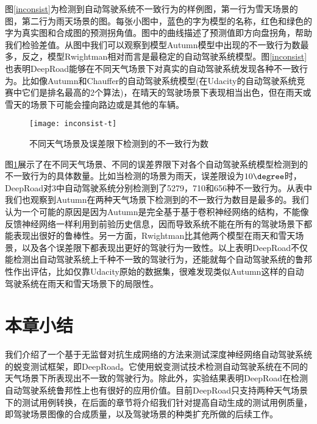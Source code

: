 图\ref{inconsist}为检测到自动驾驶系统不一致行为的样例图，第一行为雪天场景的图，第二行为雨天场景的图。每张小图中，蓝色的字为模型的名称，红色和绿色的字为真实图和合成图的预测拐角值。图中的曲线描述了预测值即方向盘拐角，帮助我们检验差值。从图中我们可以观察到模型Autumn模型中出现的不一致行为数最多，反之，模型Rwightman相对而言是最稳定的自动驾驶系统模型。图\ref{inconsist}也表明DeepRoad能够在不同天气场景下对真实的自动驾驶系统发现各种不一致行为。比如像Autumn和Chauffer的自动驾驶系统模型(在Udacity的自动驾驶系统竞赛中它们是排名最高的2个算法)，在晴天的驾驶场景下表现相当出色，但在雨天或雪天的场景下可能会撞向路边或是其他的车辆。

\begin{figure}[]
    \centering
    \texttt{[image: inconsist-t]}
    \caption{不同天气场景及误差限下检测到的不一致行为数}
    \label{inconsist-t}
\end{figure}

图\ref{inconsist-t}展示了在不同天气场景、不同的误差界限下对各个自动驾驶系统模型检测到的不一致行为的具体数量。比如当检测的场景为雨天，误差限设为$10\degree$时，DeepRoad对3中自动驾驶系统分别检测到了5279，710和656种不一致行为。从表中我们也观察到Autumn在两种天气场景下检测到的不一致行为数目是最多的。我们认为一个可能的原因是因为Autumn是完全基于基于卷积神经网络的结构，不能像反馈神经网络一样利用到前验历史信息，因而导致系统不能在所有的驾驶场景下都能表现出很好的鲁棒性。另一方面，Rwightman比其他两个模型在雨天和雪天场景，以及各个误差限下都表现出更好的驾驶行为一致性。以上表明DeepRoad不仅能检测出自动驾驶系统上千种不一致的驾驶行为，还能就每个自动驾驶系统的鲁邦性作出评估，比如仅靠Udacity原始的数据集，很难发现类似Autumn这样的自动驾驶系统在雨天和雪天场景下的局限性。

\section{本章小结}

我们介绍了一个基于无监督对抗生成网络的方法来测试深度神经网络自动驾驶系统的蜕变测试框架，即DeepRoad。它使用蜕变测试技术检测自动驾驶系统在不同的天气场景下所表现出不一致的驾驶行为。除此外，实验结果表明DeepRoad在检测自动驾驶系统鲁邦性上也有很好的应用价值。目前DeepRoad只支持两种天气场景下的测试用例转换，在后面的章节将介绍我们针对提高自动生成的测试用例质量，即驾驶场景图像的合成质量，以及驾驶场景的种类扩充所做的后续工作。